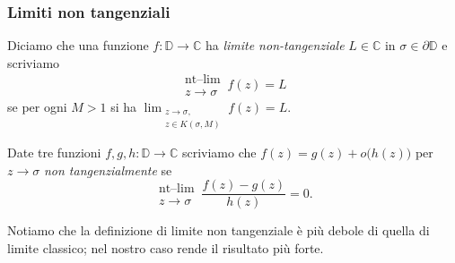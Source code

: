\begin{frame}
  \frametitle{Limiti non tangenziali}
  \begin{defn}
    Diciamo che una funzione $f:\mathbb{D} \longrightarrow \mathbb{C}$ ha \textit{limite non-tangenziale} $L \in \mathbb{C}$ in $\sigma \in \partial\mathbb{D}$ e scriviamo
    $$\substack{\text{nt--lim} \\ z \longrightarrow \sigma} \, f(z)=L$$
    se  per ogni $M>1$ si ha $\displaystyle \lim_{\substack{z \longrightarrow \sigma, \\ z \in K(\sigma,M)}} f(z)=L$.
  \end{defn}
  \pause
  \begin{defn}
    Date tre funzioni $f,g,h: \mathbb{D} \longrightarrow \mathbb{C}$ scriviamo che $f(z)=g(z)+o\bigl(h(z)\bigr)$ per $z \longrightarrow \sigma$ \textit{non tangenzialmente} se
    $$\substack{\text{nt--lim} \\ z \longrightarrow \sigma} \, \frac{f(z)-g(z)}{h(z)}=0.$$
  \end{defn}
  \pause
  Notiamo che la definizione di limite non tangenziale è più debole di quella di limite classico; nel nostro caso rende il risultato più forte.
\end{frame}

